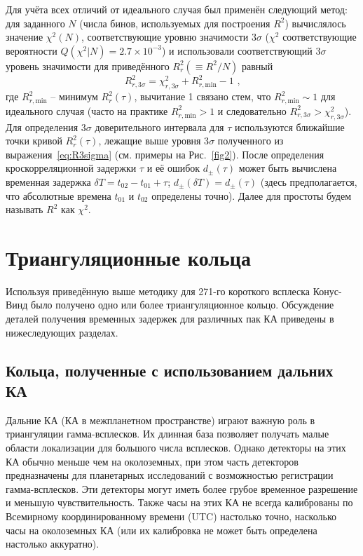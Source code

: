 Для учёта всех отличий от идеального случая был применён следующий метод: 
для заданного $N$ (числа бинов, используемых для построения $R^2$) вычислялось значение $\chi^2(N)$, 
соответствующие уровню значимости 3$\sigma$ ($\chi^2$ соответствующие вероятности $Q(\chi^2|N)=2.7\times 10^{-3}$) 
и использовали соответствующий 3$\sigma$ уровень значимости для приведённого $R^2_r(\equiv R^2/N)$ равный
\begin{equation}\label{eq:R3sigma}
R^2_{r,3\sigma} = \chi^2_{r,3\sigma} + R^2_{r,\textrm{min}} - 1 \mbox{ ,}
\end{equation}
где $R^2_{r,\textrm{min}}$ -- минимум $R^2_{r}(\tau)$, вычитание 1 связано стем, 
что $R^2_{r,\textrm{min}}\sim 1$ для идеального случая (часто на практике $R^2_{r,\textrm{min}}> 1$ 
и следовательно $R^2_{r,3\sigma} > \chi^2_{r,3\sigma}$). Для определения 3$\sigma$ 
доверительного интервала для $\tau$ используются ближайшие точки кривой  $R^2_{r}(\tau)$, 
лежащие выше уровня 3$\sigma$ полученного из выражения~\ref{eq:R3sigma} (см. примеры на Рис.~\ref{fig2}). 
После определения кроскорреляционной задержки $\tau$ и её ошибок $d_{\pm}(\tau)$ 
может быть вычислена временная задержка $\delta T = t_{02} - t_{01} + \tau$; 
$d_{\pm}(\delta T) = d_{\pm}(\tau)$ (здесь предполагается, что абсолютные времена $t_{01}$ 
и $t_{02}$ определены точно). Далее для простоты будем называть $R^2$ как $\chi^2$.

\section{Триангуляционные кольца}
Используя приведённую выше методику для 271-го короткого всплеска Конус-Винд было 
получено одно или более триангуляционное кольцо. Обсуждение деталей получения 
временных задержек для различных пак КА приведены в нижеследующих разделах.

\subsection{Кольца, полученные с использованием дальних КА}
Дальние КА (КА в межпланетном пространстве) играют важную роль в триангуляции 
гамма-всплесков. Их длинная база позволяет получать малые области локализации 
для большого числа всплесков. Однако детекторы на этих КА обычно меньше чем на 
околоземных, при этом часть детекторов предназначены для планетарных исследований 
с возможностью регистрации гамма-всплесков. Эти детекторы могут иметь более 
грубое временное разрешение и меньшую чувствительность. Также часы на этих КА 
не всегда калиброваны по Всемирному координированному времени (UTC) настолько точно, 
насколько часы на околоземных КА (или их калибровка не может быть определена настолько аккуратно).


